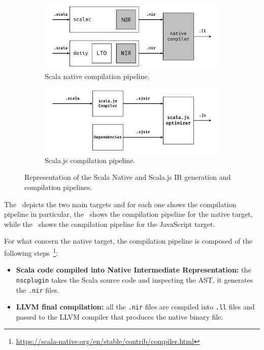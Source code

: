 \begin{figure}[ht]
	\centering
	\begin{subfigure}{.45\textwidth}
		\centering
		\includegraphics[width=\linewidth]{figures/scala-native-pipeline.pdf}
		\caption{Scala native compilation pipeline.}
		\label{fig:scala-native-ir}
	\end{subfigure}
	\begin{subfigure}{.45\textwidth}
		\centering
		\includegraphics[width=\linewidth]{figures/scala-js-pipeline.pdf}
		\caption{Scala.js compilation pipeline.}
		\label{fig:scala-js-ir}
	\end{subfigure}
	\caption[Scala Native and Scala.js compilation pipelines]{Representation of the Scala Native and Scala.js IR generation and compilation pipelines.}
	\label{fig:scala-ir}
\end{figure}

The~ depicts the two main targets and for each one shows the compilation pipeline in particular, the~
shows the compilation pipeline for the native target, while the~ shows the compilation pipeline for the JavaScript target.

For what concern the native target, the compilation pipeline is composed of the following steps~\footnote{\url{https://scala-native.org/en/stable/contrib/compiler.html}}:
\begin{itemize}
	\item \textbf{Scala code compiled into Native Intermediate Representation:} the \texttt{nscplugin} takes the Scala source code and inspecting the
	      AST, it generates the \texttt{.nir} files.
	\item \textbf{LLVM final compilation:} all the \texttt{.nir} files are compiled into \texttt{.ll} files and passed to the LLVM compiler that
	      produces the native binary file.
\end{itemize}

